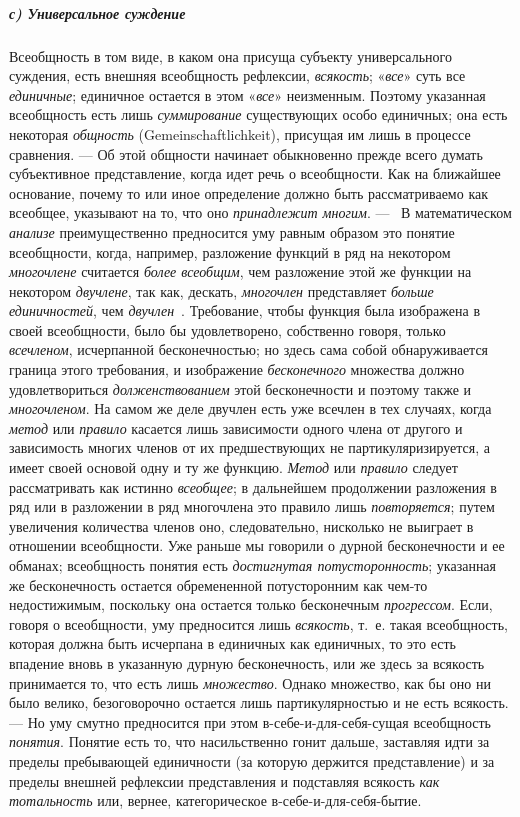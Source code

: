 \documentclass[twoside]{article}
\begin{document}
{{\subparagraph[с) Универсальное суждение]{с) Универсальное суждение}
Всеобщность в том виде, в каком она присуща субъекту
универсального суждения, есть внешняя всеобщность рефлексии,
{\em всякость};
«{\em все}» суть все
{\em единичные};
единичное остается в этом
«{\em все}» неизменным.
Поэтому указанная всеобщность есть лишь
{\em суммирование}
существующих особо единичных; она есть некоторая
{\em общность} (Gemeinschaftlichkeit),
присущая им лишь в процессе сравнения. — Об
этой общности начинает обыкновенно прежде всего думать субъективное
представление, когда идет речь о всеобщности. Как на
ближайшее основание, почему то или иное определение должно быть
рассматриваемо как всеобщее, указывают на то, что оно
{\em принадлежит многим}. —
\ В математическом
{\em анализе}
преимущественно предносится уму равным образом это понятие
всеобщности, когда, например, разложение функций в ряд на некотором
{\em многочлене}
считается {\em более
всеобщим}, чем разложение этой же функции на некотором
{\em двучлене}, так как,
дескать, {\em многочлен}
представляет {\em больше
единичностей}, чем
{\em двучлен}~\label{bkm:bm39}.
Требование, чтобы функция была изображена в своей
всеобщности, было бы удовлетворено, собственно говоря, только
{\em всечленом},
исчерпанной бесконечностью; но здесь сама собой
обнаруживается граница этого требования, и изображение
{\em бесконечного}
множества должно удовлетвориться
{\em долженствованием}
этой бесконечности и поэтому также и
{\em многочленом}. На
самом же деле двучлен есть уже всечлен в тех случаях, когда
{\em метод} или
{\em правило} касается
лишь зависимости одного члена от другого и зависимость многих членов от их
предшествующих не партикуляризируется, а имеет своей основой одну и ту же
функцию. {\em Метод} или
{\em правило} следует
рассматривать как истинно
{\em всеобщее}; в
дальнейшем продолжении разложения в ряд или в разложении в ряд многочлена
это правило лишь {\em повторяется};
путем увеличения количества членов оно, следовательно,
нисколько не выиграет в отношении всеобщности. Уже раньше мы говорили о
дурной бесконечности и ее обманах; всеобщность понятия есть
{\em достигнутая потусторонность};
указанная же бесконечность остается обремененной
потусторонним как чем-то недостижимым, поскольку она остается только
бесконечным {\em прогрессом}.
Если, говоря о всеобщности, уму предносится лишь
{\em всякость}, т.~е.
такая всеобщность, которая должна быть исчерпана в единичных как единичных,
то это есть впадение вновь в указанную дурную бесконечность, или же здесь
за всякость принимается то, что есть лишь
{\em множество}. Однако
множество, как бы оно ни было велико, безоговорочно остается лишь
партикулярностью и не есть всякость. — Но уму смутно
предносится при этом в-себе-и-для-себя-сущая всеобщность
{\em понятия}. Понятие
есть то, что насильственно гонит дальше, заставляя идти за пределы
пребывающей единичности (за которую держится представление) и за пределы
внешней рефлексии представления и подставляя всякость
{\em как тотальность}
или, вернее, категорическое в-себе-и-для-себя-бытие.

}}
\end{document}
